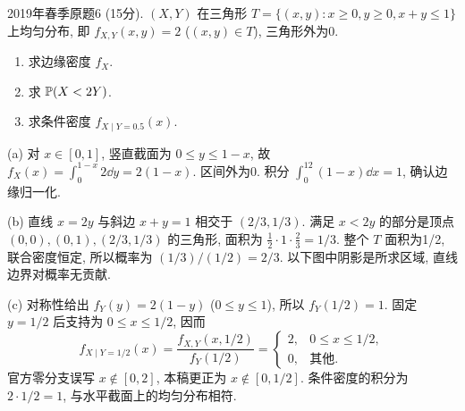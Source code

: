 \begin{exercise}\label{m2:2019s:q6}
2019年春季原题6 (15分). $(X,Y)$ 在三角形 $T=\{(x,y):x\ge0,y\ge0,x+y\le1\}$ 上均匀分布, 即 $f_{X,Y}(x,y)=2$ ($(x,y)\in T$), 三角形外为0.
\begin{enumerate}
\item[(a)]\label{m2:2019s:q6:a} 求边缘密度 $f_X$.
\item[(b)]\label{m2:2019s:q6:b} 求 $\mathbb P(X<2Y)$.
\item[(c)]\label{m2:2019s:q6:c} 求条件密度 $f_{X\mid Y=0.5}(x)$.
\end{enumerate}
\end{exercise}
\begin{solution}
(a) 对 $x\in[0,1]$, 竖直截面为 $0\le y\le1-x$, 故 $f_X(x)=\int_0^{1-x}2\dd y=2(1-x)$. 区间外为0. 积分 $\int_0^12(1-x)\dd x=1$, 确认边缘归一化.

(b) 直线 $x=2y$ 与斜边 $x+y=1$ 相交于 $(2/3,1/3)$. 满足 $x<2y$ 的部分是顶点 $(0,0),(0,1),(2/3,1/3)$ 的三角形, 面积为 $\frac12\cdot1\cdot\frac23=1/3$. 整个 $T$ 面积为1/2, 联合密度恒定, 所以概率为 $(1/3)/(1/2)=2/3$. 以下图中阴影是所求区域, 直线边界对概率无贡献.
\begin{center}
\end{center}

(c) 对称性给出 $f_Y(y)=2(1-y)$ ($0\le y\le1$), 所以 $f_Y(1/2)=1$. 固定 $y=1/2$ 后支持为 $0\le x\le1/2$, 因而
\[
f_{X\mid Y=1/2}(x)=\frac{f_{X,Y}(x,1/2)}{f_Y(1/2)}=\begin{cases}2,&0\le x\le1/2,\\0,&\text{其他}.\end{cases}
\]
官方零分支误写 $x\notin[0,2]$, 本稿更正为 $x\notin[0,1/2]$. 条件密度的积分为 $2\cdot1/2=1$, 与水平截面上的均匀分布相符.
\end{solution}

